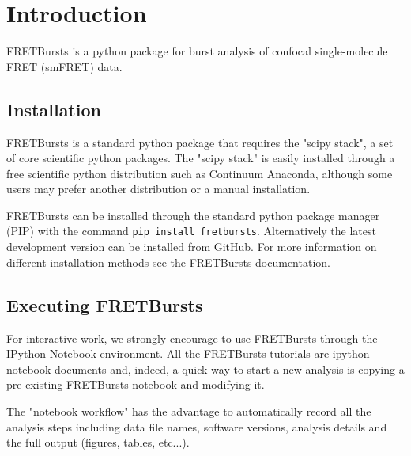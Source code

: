 \section{Introduction}

FRETBursts is a python package for burst analysis of confocal single-molecule FRET (smFRET) data.

\subsection{Installation}
FRETBursts is a standard python package that requires the "scipy stack", a set of core scientific python packages.
The "scipy stack" is easily installed through a free scientific python distribution such as Continuum Anaconda, although some users may prefer another distribution or a manual installation.

FRETBursts can be installed through the standard python package manager (PIP) with 
the command \verb|pip install fretbursts|. Alternatively the latest development version can be installed from GitHub.
For more information on different installation methods see the \href{http://fretbursts.readthedocs.org/en/latest/installation.html}{FRETBursts documentation}.

\subsection{Executing FRETBursts}
For interactive work, we strongly encourage to use FRETBursts through the IPython Notebook environment. All the FRETBursts tutorials are ipython notebook documents and, indeed, a quick way to start a new analysis is copying a pre-existing FRETBursts notebook and modifying it.

The "notebook workflow"\cite{Shen_2014} has the advantage to automatically record all the analysis steps including
data file names, software versions, analysis details and the full output (figures, tables, etc...).
